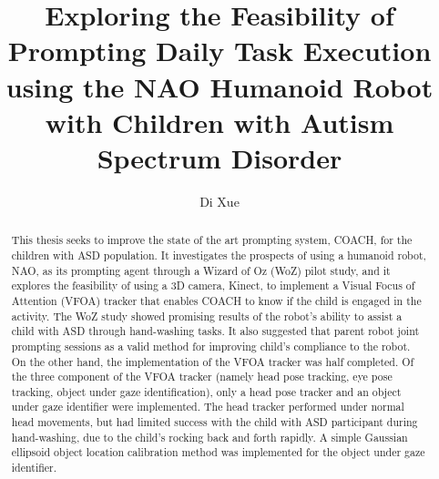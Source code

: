 \documentclass{ut-thesis}
\author{Di Xue}
\title{Exploring the Feasibility of Prompting Daily Task Execution using the NAO Humanoid Robot with Children with Autism Spectrum Disorder}
\begin{document}
\begin{preliminary}

\maketitle


\begin{abstract}
This thesis seeks to improve the state of the art prompting system, COACH, for the children with ASD population.  It investigates the prospects of using a humanoid robot, NAO, as its prompting agent through a Wizard of Oz (WoZ) pilot study, and it explores the feasibility of using a 3D camera, Kinect, to implement a Visual Focus of Attention (VFOA) tracker that enables COACH to know if the child is engaged in the activity.  The WoZ study showed promising results of the robot's ability to assist a child with ASD through hand-washing tasks.  It also suggested that parent robot joint prompting sessions as a valid method for improving child's compliance to the robot.  On the other hand, the implementation of the VFOA tracker was half completed.  Of the three component of the VFOA tracker (namely head pose tracking, eye pose tracking, object under gaze identification), only a head pose tracker and an object under gaze identifier were implemented.  The head tracker performed under normal head movements, but had limited success with the child with ASD participant during hand-washing, due to the child's rocking back and forth rapidly.  A simple Gaussian ellipsoid object location calibration method was implemented for the object under gaze identifier.
\end{abstract}



\end{preliminary}
\end{document}
